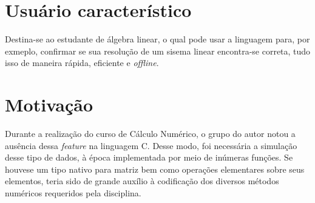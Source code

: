 \documentclass[
	article,			%
	11pt,				%
	oneside,			%
	a4paper,			%
	english,			%
	brazil,				%
	sumario=tradicional
	]{abntex2}
\renewcommand{\it}[1]{\textit{#1}}
\begin{document}
\section{Usuário característico}
Destina-se ao estudante de álgebra linear, o qual pode usar a linguagem para, por exmeplo, confirmar se sua resolução de um sisema linear encontra-se correta, tudo isso de maneira rápida, eficiente e \it{offline}.

\section{Motivação}
Durante a realização do curso de Cálculo Numérico, o grupo do autor notou a ausência dessa \it{feature} na linguagem C. Desse modo, foi necessária a simulação desse tipo de dados, à época implementada por meio de inúmeras funções. Se houvese um tipo nativo para matriz bem como operações elementares sobre seus elementos, teria sido de grande auxílio à codificação dos diversos métodos numéricos requeridos pela disciplina.
\par
\end{document}
